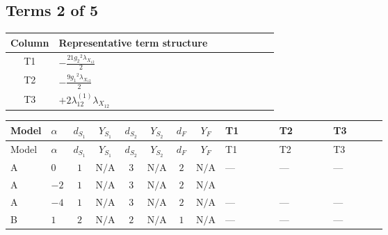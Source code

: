 \documentclass[8pt]{article}
\begin{document}
\begin{landscape}
\subsection*{Terms 2 of 5}
\begin{center}
\begin{tabular}{@{}c >{\raggedright\arraybackslash}p{0.82\linewidth}@{}}
\toprule
Column & Representative term structure \\
\midrule
T1 & \(\displaystyle -\frac{21 {g_2}^2 {\lambda_{X_{12}}}}{2}\) \\
\midrule
T2 & \(\displaystyle -\frac{9 {g_1}^2 {\lambda_{X_{12}}}}{2}\) \\
\midrule
T3 & \(\displaystyle +2 {\lambda_{12}^{(1)}} {\lambda_{X_{12}}}\) \\
\midrule
\bottomrule
\end{tabular}
\end{center}
\smallskip
\tiny
\begin{longtable}{@{}llcccccc >{\raggedright\arraybackslash}p{0.21\linewidth} >{\raggedright\arraybackslash}p{0.21\linewidth} >{\raggedright\arraybackslash}p{0.21\linewidth}@{}}
\toprule
Model & $\alpha$ & $d_{S_1}$ & $Y_{S_1}$ & $d_{S_2}$ & $Y_{S_2}$ & $d_F$ & $Y_F$ & T1 & T2 & T3 \\
\midrule
\endfirsthead
\toprule
Model & $\alpha$ & $d_{S_1}$ & $Y_{S_1}$ & $d_{S_2}$ & $Y_{S_2}$ & $d_F$ & $Y_F$ & T1 & T2 & T3 \\
\midrule
\endhead
A & $0$ & $1$ & $\text{N/A}$ & $3$ & $\text{N/A}$ & $2$ & $\text{N/A}$ & --- & --- & --- \\
\midrule
A & $-2$ & $1$ & $\text{N/A}$ & $3$ & $\text{N/A}$ & $2$ & $\text{N/A}$ & \scriptsize\adjustbox{max width=\linewidth}{$\begin{gathered} -\frac{21 {g_2}^2 {\lambda_{X_{12}}}}{2}\end{gathered}$} & \scriptsize\adjustbox{max width=\linewidth}{$\begin{gathered} -\frac{9 {g_1}^2 {\lambda_{X_{12}}}}{2}\end{gathered}$} & \scriptsize\adjustbox{max width=\linewidth}{$\begin{gathered} +2 {\lambda_{12}^{(1)}} {\lambda_{X_{12}}}\end{gathered}$} \\
\midrule
A & $-4$ & $1$ & $\text{N/A}$ & $3$ & $\text{N/A}$ & $2$ & $\text{N/A}$ & --- & --- & --- \\
\midrule
B & $1$ & $2$ & $\text{N/A}$ & $2$ & $\text{N/A}$ & $1$ & $\text{N/A}$ & --- & --- & --- \\

\end{longtable}
\end{landscape}
\end{document}
